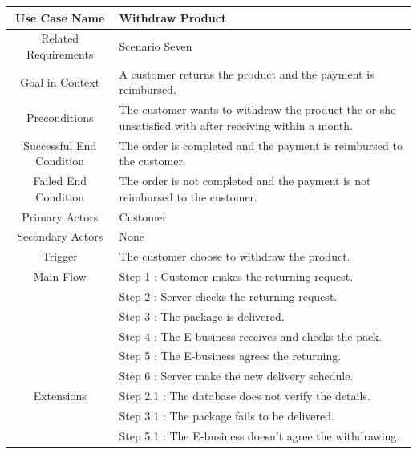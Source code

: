 \documentclass[12pt]{scrreprt}
\begin{document}
\begin{table}
  \centering
  \begin{tabular}{| c | p{11cm} |}
    \hline
    Use Case Name & Withdraw Product\\
    \hline
    Related Requirements & Scenario Seven\\
    \hline
    Goal in Context & A customer returns the product and the payment is
    reimbursed.\\
    \hline
    Preconditions & The customer wants to withdraw the product the or she
    unsatisfied with after receiving within a month.\\
    \hline
    Successful End Condition & The order is completed and the payment is
    reimbursed to the customer.\\
    \hline
    Failed End Condition & The order is not completed and the payment is not
    reimbursed to the customer.\\
    \hline
    Primary Actors & Customer\\
    \hline
    Secondary Actors & None\\
    \hline
    Trigger & The customer choose to withdraw the product.\\
    \hline
    Main Flow & Step 1 : Customer makes the returning request.\\
    & Step 2 : Server checks the returning request.\\
    & Step 3 : The package is delivered.\\
    & Step 4 : The E-business receives and checks the pack.\\
    & Step 5 : The E-business agrees the returning.\\
    & Step 6 : Server make the new delivery schedule.\\
    \hline
    Extensions & Step 2.1 : The database does not verify the details.\\
    & Step 3.1 : The package fails to be delivered.\\
    & Step 5.1 : The E-business doesn't agree the withdrawing.\\
    \hline
  \end{tabular}
\end{table}
\end{document}
